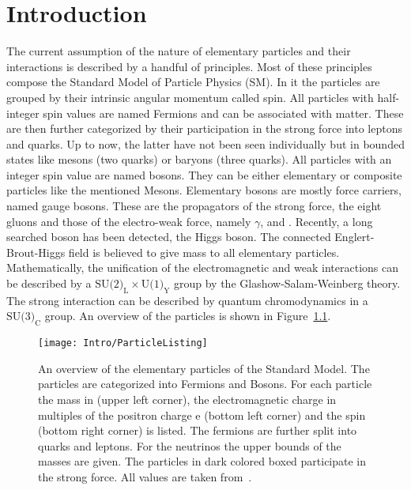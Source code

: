 \chapter{Introduction \label{sec:Intro}}

The current assumption of the nature of elementary particles and their interactions is described by a handful of principles. Most of these principles compose the Standard Model of Particle Physics (SM). In it the particles are grouped by their intrinsic angular momentum called spin. All particles with half-integer spin values are named Fermions and can be associated with matter. These are then further categorized by their participation in the strong force into leptons and quarks. Up to now, the latter have not been seen individually but in bounded states like mesons (two quarks) or baryons (three quarks). All particles with an integer spin value are named bosons. They can be either elementary or composite particles like the mentioned Mesons. Elementary bosons are mostly force carriers, named gauge bosons. These are the propagators of the strong force, the eight gluons and those of the electro-weak force, namely $\gamma{}$, \Zz{} and \Wpm{}. Recently, a long searched boson has been detected, the Higgs boson. The connected Englert-Brout-Higgs field is believed to give mass to all elementary particles. \\
Mathematically, the unification of the electromagnetic and weak interactions can be described by a $\textrm{SU(2)}_{\textrm{L}} \times \textrm{U(1)}_{\textrm{Y}}$ group by the Glashow-Salam-Weinberg theory. The strong interaction can be described by quantum chromodynamics in a $\textrm{SU(3)}_{\textrm{C}}$ group. An overview of the particles is shown in Figure~\ref{plot:IntroParticles}.

\begin{figure}[!htb]
  \centering
  \texttt{[image: Intro/ParticleListing]}
  \caption[Overview of the elementary particles]{An overview of the elementary particles of the Standard Model. The particles are categorized into Fermions and Bosons. For each particle the mass in \MeV (upper left corner), the electromagnetic charge in multiples of the positron charge e (bottom left corner) and the spin (bottom right corner) is listed. The fermions are further split into quarks and leptons. For the neutrinos the upper bounds of the masses are given. The particles in dark colored boxed participate in the strong force. All values are taken from~. \label{plot:IntroParticles} }
\end{figure}

